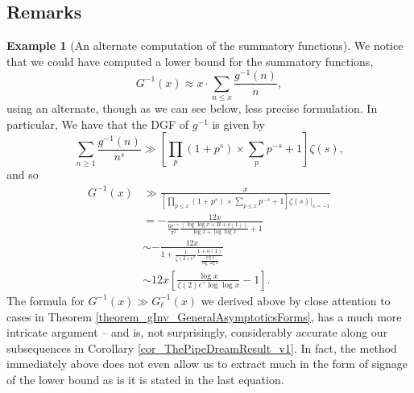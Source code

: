 \documentclass[11pt,reqno,a4letter]{article}
\numberwithin{figure}{section}
\numberwithin{table}{section}
\theoremstyle{plain}
\numberwithin{theorem}{section}
\theoremstyle{definition}
\newtheorem{example}[theorem]{Example}
\begin{document}
\subsection{Remarks} 

\begin{example}[An alternate computation of the summatory functions]
We notice that we could have computed a lower bound for the summatory functions, 
$$G^{-1}(x) \approx x \cdot \sum_{n \leq x} \frac{g^{-1}(n)}{n},$$ using an 
alternate, though as we can see below, less precise formulation. In particular, 
We have that the DGF of $g^{-1}$ is given by 
\[
\sum_{n \geq 1} \frac{g^{-1}(n)}{n^s} \gg 
     \left[\prod_{p} \left(1+p^{s}\right) \times \sum_p p^{-s} + 1\right] \zeta(s), 
\]
and so 
\begin{align*} 
G^{-1}(x) & \gg \frac{x}{\left[\prod_{p \leq x} \left(1+p^{s}\right) \times \sum_{p \leq x} p^{-s} + 1 
     \right] \zeta(s) \Bigr\rvert_{s=-1}} \\ 
     & = -\frac{12 x}{\frac{6e^{-\gamma}}{\pi^2}\frac{\left(\log\log x + B + o(1)\right)}{\log x + \log\log x} 
     + 1} \\ 
     & \sim -\frac{12 x}{1 + \frac{1}{\zeta(2) e^{\gamma}} \frac{1 + o(1)}{\frac{\log x}{\log\log x}}} \\ 
     & \sim 12x \left[\frac{\log x}{\zeta(2) e^{\gamma} \log\log x} - 1\right]. 
\end{align*} 
The formula for $G^{-1}(x) \gg G_{\ell}^{-1}(x)$ we derived above by close attention to cases in 
Theorem \ref{theorem_gInv_GeneralAsymptoticsForms}, 
has a much more intricate argument -- and is, not surprisingly, considerably accurate along our subsequences in 
Corollary \ref{cor_ThePipeDreamResult_v1}. In fact, the method immediately 
above does not even allow us to extract much in the form of signage of the lower bound as is 
it is stated in the last equation. 
\end{example} 
\end{document}
